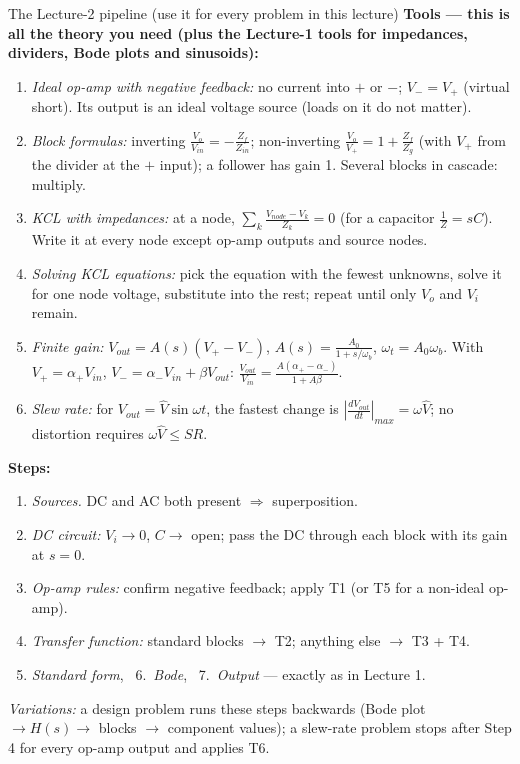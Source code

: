 \documentclass[11pt]{article}
\begin{document}
\begin{cardbox}{The Lecture-2 pipeline (use it for every problem in this lecture)}
\textbf{Tools --- this is all the theory you need (plus the Lecture-1 tools for impedances, dividers, Bode plots
and sinusoids):}
\begin{enumerate}[label=\textbf{T\arabic*},leftmargin=2.2em,itemsep=1pt]
\item \emph{Ideal op-amp with negative feedback:} no current into $+$ or $-$; $V_-=V_+$ (virtual short).
      Its output is an ideal voltage source (loads on it do not matter).
\item \emph{Block formulas:} inverting $\frac{V_o}{V_{in}}=-\frac{Z_f}{Z_{in}}$; non-inverting
      $\frac{V_o}{V_+}=1+\frac{Z_f}{Z_g}$ (with $V_+$ from the divider at the $+$ input); a follower has gain 1.
      Several blocks in cascade: multiply.
\item \emph{KCL with impedances:} at a node, $\sum_k \frac{V_{node}-V_k}{Z_k}=0$ (for a capacitor
      $\frac{1}{Z}=sC$). Write it at every node except op-amp outputs and source nodes.
\item \emph{Solving KCL equations:} pick the equation with the fewest unknowns, solve it for one node voltage,
      substitute into the rest; repeat until only $V_o$ and $V_i$ remain.
\item \emph{Finite gain:} $V_{out}=A(s)(V_+-V_-)$, $A(s)=\frac{A_0}{1+s/\omega_b}$, $\omega_t=A_0\omega_b$.
      With $V_+=\alpha_+V_{in}$, $V_-=\alpha_-V_{in}+\beta V_{out}$: $\frac{V_{out}}{V_{in}}=\frac{A(\alpha_+-\alpha_-)}{1+A\beta}$.
\item \emph{Slew rate:} for $V_{out}=\hat V\sin\omega t$, the fastest change is $\left|\frac{dV_{out}}{dt}\right|_{max}=\omega\hat V$;
      no distortion requires $\omega\hat V\le SR$.
\end{enumerate}
\textbf{Steps:}
\begin{enumerate}[leftmargin=2.2em,itemsep=1pt]
\item \emph{Sources.} DC and AC both present $\Rightarrow$ superposition.
\item \emph{DC circuit:} $V_i\to0$, $C\to$ open; pass the DC through each block with its gain at $s=0$.
\item \emph{Op-amp rules:} confirm negative feedback; apply T1 (or T5 for a non-ideal op-amp).
\item \emph{Transfer function:} standard blocks $\to$ T2; anything else $\to$ T3 + T4.
\item \emph{Standard form}, \ 6.~\emph{Bode}, \ 7.~\emph{Output} --- exactly as in Lecture 1.
\end{enumerate}
\emph{Variations:} a design problem runs these steps backwards (Bode plot $\to H(s)\to$ blocks $\to$ component values);
a slew-rate problem stops after Step 4 for every op-amp output and applies T6.
\end{cardbox}
\end{document}
